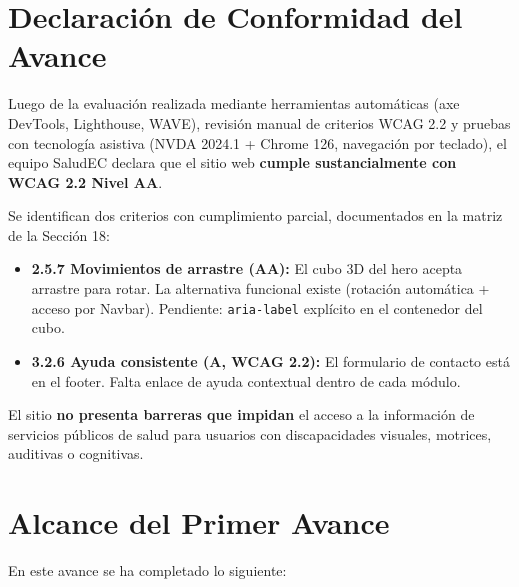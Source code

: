 \documentclass[12pt, a4paper]{article}
\begin{document}
\section{Declaración de Conformidad del Avance}

\begin{wcagbox}
Luego de la evaluación realizada mediante herramientas automáticas (axe DevTools, Lighthouse, WAVE), revisión manual de criterios WCAG 2.2 y pruebas con tecnología asistiva (NVDA 2024.1 + Chrome 126, navegación por teclado), el equipo SaludEC declara que el sitio web \textbf{cumple sustancialmente con WCAG 2.2 Nivel AA}.

Se identifican dos criterios con cumplimiento parcial, documentados en la matriz de la Sección 18:
\begin{itemize}
  \item \textbf{2.5.7 Movimientos de arrastre (AA):} El cubo 3D del hero acepta arrastre para rotar. La alternativa funcional existe (rotación automática + acceso por Navbar). Pendiente: \texttt{aria-label} explícito en el contenedor del cubo.
  \item \textbf{3.2.6 Ayuda consistente (A, WCAG 2.2):} El formulario de contacto está en el footer. Falta enlace de ayuda contextual dentro de cada módulo.
\end{itemize}

El sitio \textbf{no presenta barreras que impidan} el acceso a la información de servicios públicos de salud para usuarios con discapacidades visuales, motrices, auditivas o cognitivas.
\end{wcagbox}

\section{Alcance del Primer Avance}

En este avance se ha completado lo siguiente:
\end{document}
